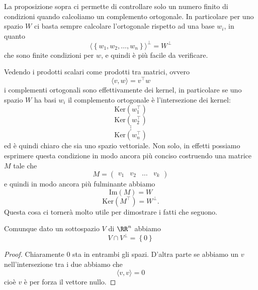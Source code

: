 \documentclass[11pt]{scrartcl}
\newcommand{\Immagine}[1]{\text{Im}\left(#1\right)}
\renewcommand{\ker}[1]{\text{Ker}\left(#1\right)}
\begin{document}
   	 
   	 La proposizione sopra ci permette di controllare solo un numero finito di condizioni quando calcoliamo un complemento ortogonale. In particolare per uno spazio $W$ ci basta sempre calcolare l'ortogonale rispetto ad una base $w_i$, in quanto
   	 $$\langle \left\{w_1,w_2,\dots,w_n\right\}\rangle^\perp = W^\perp$$
   	 che sono finite condizioni per $w$, e quindi è più facile da verificare.
   	 
   	 \begin{remark}
   	 	Vedendo i prodotti scalari come prodotti tra matrici, ovvero
   	 	$$\langle v,w\rangle = v^\intercal w$$
   	 	i complementi ortogonali sono effettivamente dei kernel, in particolare se uno spazio $W$ ha basi $w_i$ il complemento ortogonale è l'intersezione dei kernel:
   	 	$$\ker{w_1^\intercal}$$
   	 	$$\ker{w_2^\intercal}$$
   	 	$$\vdots$$
   	 	$$\ker{w_n^\intercal}$$
   	 	ed è quindi chiaro che sia uno spazio vettoriale. Non solo, in effetti possiamo esprimere questa condizione in modo ancora più conciso costruendo una matrice $M$ tale che
   	 	$$M=\left(
   	 		\begin{array}{c|c|c|c}
   	 			v_1 & v_2 & \dots & v_k
   	 		\end{array}
   	 	\right)$$ 
   	 	e quindi in modo ancora più fulminante abbiamo
   	 	$$\Immagine{M}=W$$
   	 	$$\ker{M^\intercal}=W^\perp.$$
   	 	Questa cosa ci tornerà molto utile per dimostrare i fatti che seguono.
   	 \end{remark}
   	 
   	 \begin{lemma}
   	 	Comunque dato un sottospazio $V$ di $\RR^n$ abbiamo
   	 	$$V\cap V^\perp = \left\{0\right\}$$ 
   	 \end{lemma}
   	 \begin{proof}
   	 	Chiaramente $0$ sta in entrambi gli spazi. D'altra parte se abbiamo un $v$ nell'intersezione tra i due abbiamo che 
   	 	$$\langle v,v\rangle =0$$
   	 	cioè $v$ è per forza il vettore nullo.
   	 \end{proof}
   	 
\end{document}
